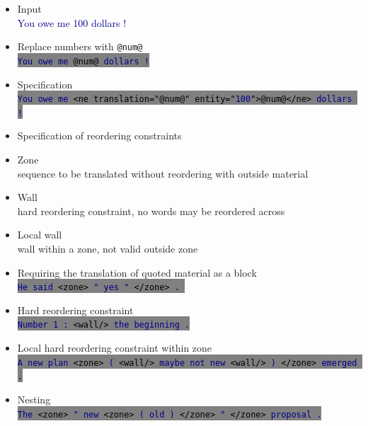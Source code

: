 \documentclass[landscape]{uedslides2C}
\newcommand{\example}[1]{\textcolor{darkblue}{\rm #1}}
\newcommand{\littlecode}[1]{\colorbox{gray}{\textcolor{black}{\small \tt #1}}}
\begin{document}

\vspace{2cm}
\begin{itemize}
\item Input \\
\example{You owe me 100 dollars !}
\item Replace numbers with {\tt @num@}\\[4mm]
 \littlecode{\example{You owe me} @num@ \example{dollars !}}
\item Specification\\[4mm]
 \littlecode{\example{You owe me}  <ne translation="@num@" entity="\example{100}">@num@</ne> \example{dollars !}}
\end{itemize}



\vspace{10mm}
\begin{itemize}
\item Specification of reordering constraints
\item Zone\\[2mm] sequence to be translated without reordering with outside material
\item Wall\\[2mm] hard reordering constraint, no words may be reordered across
\item Local wall\\[2mm] wall within a zone, not valid outside zone
\end{itemize}


\vspace{10mm}
\begin{itemize}
\item Requiring the translation of quoted material as a block\\
\littlecode{\example{He said} <zone> \example{" yes "} </zone> . }
\item Hard reordering constraint\\
\littlecode{\example{Number 1 : }<wall/> \example{the beginning .}}
\item Local hard reordering constraint within zone\\
\littlecode{\example{A new plan} <zone> \example{(} <wall/> \example{maybe not new} <wall/> \example{)} </zone> \example{emerged .}}
\item Nesting\\
\littlecode{\example{The} <zone> \example{" new} <zone> \example{( old )} </zone> \example{"} </zone> \example{proposal .}}
\end{itemize}
\end{document}
